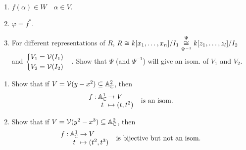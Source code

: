 \begin{exercise} \mbox{}
  \begin{enumerate}
    \item $f(\alpha) \in W \quad \alpha \in V$.
    \item $\varphi = f^*$.
    \item For different representations of $R$,
      $R \cong {k[x_1, \dots, x_n]}/{I_1} \underset{\Psi^{-1}}{\overset{\Psi}{\cong}}
      {k[z_1, \dots, z_l]}/{I_2}$
      and $\begin{cases}V_1 = \mathcal{V}(I_1) \\ V_2 = \mathcal{V}(I_2) \end{cases}$.
      Show that $\Psi$ (and $\Psi^{-1}$) will give an isom. of $V_1$ and $V_2$.
  \end{enumerate}
\end{exercise}

\begin{exercise} \mbox{}
  \begin{enumerate}
    \item Show that if $V = \mathcal{V}(y-x^2) \subseteq \mathbb{A}^2_{\mathbb{C}}$, then
      \[
        \deffunc{f}{\Ab_\Cb^1}{V}{t}{(t, t^2)}
        \quad \text{is an isom.}
      \]
    \item Show that if $V = \mathcal{V}(y^2-x^3) \subseteq \mathbb{A}^2_{\mathbb{C}}$, then
      \[
        \deffunc{f}{\Ab_\Cb^1}{V}{t}{(t^2, t^3)}
        \quad \text{is bijective but not an isom.}
      \]
  \end{enumerate}
\end{exercise}
